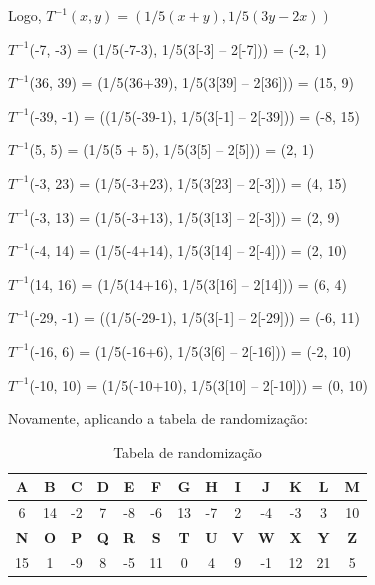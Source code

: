 Logo, $T^{-1}(x, y) = (1/5(x + y), 1/5(3y -2x))$

\centerline{$T^{-1}$(-7, -3) = (1/5(-7-3), 1/5(3[-3] – 2[-7])) = (-2, 1)}

\centerline{$T^{-1}$(36, 39) = (1/5(36+39), 1/5(3[39] – 2[36])) = (15, 9)}

\centerline{$T^{-1}$(-39, -1) = ((1/5(-39-1), 1/5(3[-1] – 2[-39])) = (-8, 15)}

\centerline{$T^{-1}$(5, 5) = (1/5(5 + 5), 1/5(3[5] – 2[5])) = (2, 1)}

\centerline{$T^{-1}$(-3, 23) = (1/5(-3+23), 1/5(3[23] – 2[-3])) = (4, 15)}

\centerline{$T^{-1}$(-3, 13) = (1/5(-3+13), 1/5(3[13] – 2[-3])) = (2, 9)}

\centerline{$T^{-1}($-4, 14) = (1/5(-4+14), 1/5(3[14] – 2[-4])) = (2, 10)}

\centerline{$T^{-1}$(14, 16) = (1/5(14+16), 1/5(3[16] – 2[14])) = (6, 4)}

\centerline{$T^{-1}$(-29, -1) = ((1/5(-29-1), 1/5(3[-1] – 2[-29])) = (-6, 11)}

\centerline{$T^{-1}$(-16, 6) = (1/5(-16+6), 1/5(3[6] – 2[-16])) = (-2, 10)}

\centerline{$T^{-1}$(-10, 10) = (1/5(-10+10), 1/5(3[10] – 2[-10])) = (0, 10)}

Novamente, aplicando a tabela de randomização:

\begin{table}[h]
	\centering
	\begin{tabular}{@{} *{13}{c} @{}}
		\toprule
		\textbf{A} & \textbf{B} & \textbf{C} & \textbf{D} & \textbf{E} & \textbf{F} & \textbf{G} & \textbf{H} & \textbf{I} & \textbf{J} & \textbf{K} & \textbf{L} & \textbf{M} \\
		\midrule
		6          & 14         & -2         & 7          & -8         & -6         & 13         & -7         & 2          & -4         & -3         & 3          & 10         \\
		\toprule
		\textbf{N} & \textbf{O} & \textbf{P} & \textbf{Q} & \textbf{R} & \textbf{S} & \textbf{T} & \textbf{U} & \textbf{V} & \textbf{W} & \textbf{X} & \textbf{Y} & \textbf{Z} \\
		\midrule
		15         & 1          & -9         & 8          & -5         & 11         & 0          & 4          & 9          & -1         & 12         & 21         & 5          \\
		\bottomrule
	\end{tabular}
	\caption{Tabela de randomização \cite{helio2009}}
\end{table}

